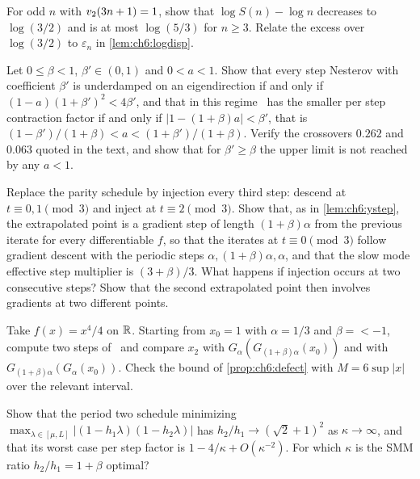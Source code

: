 \begin{exercise}
For odd $n$ with $v_2(3n+1)=1$, show that $\log S(n)-\log n$ decreases to
$\log(3/2)$ and is at most $\log(5/3)$ for $n\ge3$. Relate the excess over
$\log(3/2)$ to $\varepsilon_n$ in \cref{lem:ch6:logdisp}.
\end{exercise}

\begin{exercise}
Let $0\le\beta<1$, $\beta'\in(0,1)$ and $0<a<1$. Show that every step Nesterov with coefficient $\beta'$ is underdamped on an eigendirection if and only if $(1-a)(1+\beta')^2<4\beta'$, and that in this regime \smmdet\ has the smaller per step contraction factor if and only if $|1-(1+\beta)a|<\beta'$, that is $(1-\beta')/(1+\beta)<a<(1+\beta')/(1+\beta)$. Verify the crossovers $0.262$ and $0.063$ quoted in the text, and show that for $\beta'\ge\beta$ the upper limit is not reached by any $a<1$.
\end{exercise}

\begin{exercise}
Replace the parity schedule by injection every third step: descend at $t\equiv0,1\pmod3$ and inject at $t\equiv2\pmod3$. Show that, as in \cref{lem:ch6:ystep}, the extrapolated point is a gradient step of length $(1+\beta)\alpha$ from the previous iterate for every differentiable $f$, so that the iterates at $t\equiv0\pmod3$ follow gradient descent with the periodic steps $\alpha,(1+\beta)\alpha,\alpha$, and that the slow mode effective step multiplier is $(3+\beta)/3$. What happens if injection occurs at two consecutive steps? Show that the second extrapolated point then involves gradients at two different points.
\end{exercise}

\begin{exercise}
Take $f(x)=x^4/4$ on $\mathbb{R}$. Starting from $x_0=1$ with $\alpha=1/3$ and
$\beta=\lt-1$, compute two steps of \smmdet\ and compare $x_2$ with
$G_\alpha(G_{(1+\beta)\alpha}(x_0))$ and with $G_{(1+\beta)\alpha}(G_\alpha(x_0))$.
Check the bound of \cref{prop:ch6:defect} with $M=6\sup|x|$ over the relevant
interval.
\end{exercise}

\begin{exercise}
Show that the period two schedule minimizing
$\max_{\lambda\in[\mu,L]}|(1-h_1\lambda)(1-h_2\lambda)|$ has
$h_2/h_1\to(\sqrt2+1)^2$ as $\kappa\to\infty$, and that its worst case per step
factor is $1-4/\kappa+O(\kappa^{-2})$. For which $\kappa$ is the SMM ratio
$h_2/h_1=1+\beta$ optimal?
\end{exercise}
